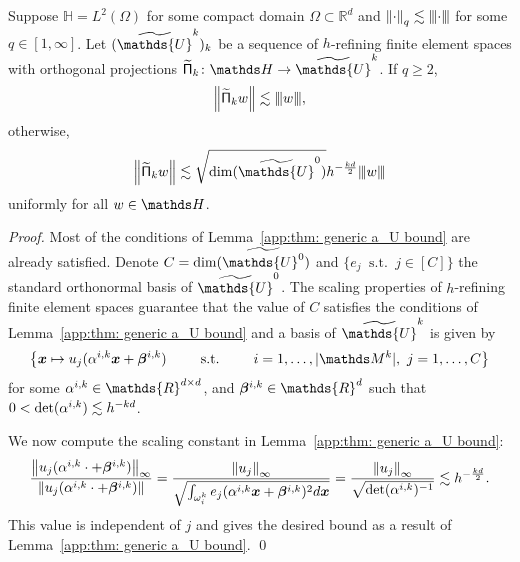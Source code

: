 \documentclass[smallextended]{svjour3}
\let\F\mathds\let\C\mathcal\newcommand{\R}{\F{R}}\newcommand{\A}{\tens{A}}
\newcommand{\norm}[1]{{\left\lVert #1 \right\rVert}}
\newcommand{\Norm}[1]{{\left\vert\kern-0.25ex\left\vert\kern-0.25ex\left\vert #1 \right\vert\kern-0.25ex\right\vert\kern-0.25ex\right\vert}}
\newcommand{\op}[1]{\operatorname{#1}}
\newcommand{\1}{\F{1}}
\DeclareMathOperator{\st}{\;s.t.\;}
\newcommand*{\varf}[1]{%
	\IfEqCase{#1}{%
		{0}{u}%
		{1}{v}%
		{2}{w}%
	}[u#1]%
}
\newcommand*{\spcf}[1]{%
	\IfEqCase{#1}{%
		{0}{\F{U}}%
		{1}{\F{V}}%
		{2}{\F{W}}%
	}[\F{U}#1]%
}
\newcommand*{\varx}[1]{%
	\IfEqCase{#1}{%
		{0}{x}%
		{1}{y}%
		{2}{z}%
		{3}{r}%
	}[x#1]%
}
\newcommand*{\vars}[1]{%
	\IfEqCase{#1}{%
		{0}{\alpha}%
		{1}{\beta}%
		{2}{\gamma}%
		{3}{a}%
		{4}{b}%
		{5}{c}%
	}[k#1]%
}
\newcommand{\Domain}{\Omega}\newcommand{\domain}{\omega}
\newcommand{\meshsize}{h}
\newcommand*{\vvarx}[1]{\vec{\varx{#1}}}
\newcommand*{\vvars}[1]{\vec{\vars{#1}}}
\begin{document}
	
	\begin{lemma}\label{app:thm: specific a_U bound}
		Suppose $\F H= L^2(\Domain)$ for some compact domain $\Domain\subset\R^d$ and $\norm\cdot_q\lesssim \Norm\cdot$ for some $q\in[1,\infty]$. Let $(\tilde{\spcf0}^k)_k$ be a sequence of $\meshsize$-refining finite element spaces with orthogonal projections $\tilde{\tens{\Pi}}_k\colon\F H\to\tilde{\spcf0}^k $. If $q\geq 2$,
		$$\norm{\tilde{\tens{\Pi}}_k\varf2} \lesssim \Norm{\varf2}, $$
		otherwise,
		$$\norm{\tilde{\tens{\Pi}}_k\varf2} \lesssim \sqrt{\op{dim}(\tilde{\spcf0}^0)}\meshsize^{-\frac{kd}{2}}\Norm{\varf2} $$
		uniformly for all $\varf2\in \F H$.
	\end{lemma}
	\begin{proof}
		Most of the conditions of Lemma~\ref{app:thm: generic a_U bound} are already satisfied. Denote $C=\op{dim}(\tilde{\spcf0^0})$ and $\{e_j\st j\in[C]\}$ the standard orthonormal basis of $\tilde{\spcf0}^0$. The scaling properties of $\meshsize$-refining finite element spaces guarantee that the value of $C$ satisfies the conditions of Lemma~\ref{app:thm: generic a_U bound} and a basis of $\tilde{\spcf0}^k$ is given by
		\begin{equation}
			\left\{\vvarx0\mapsto\varf0_j(\vars0^{i,k}\vvarx0+\vvars1^{i,k}) \qquad\st\qquad i=1,\ldots,|\F M^k|,\ j=1,\ldots,C\right\}
		\end{equation}
		for some $\vars0^{i,k}\in\R^{d\times d}$, and $\vvars1^{i,k}\in\R^d$ such that $0<\op{det}(\vars0^{i,k})\lesssim \meshsize^{-kd}$.
		
		We now compute the scaling constant in Lemma~\ref{app:thm: generic a_U bound}:
		\begin{equation}
			\frac{\norm{\varf0_j(\vars0^{i,k}\cdot+\vvars1^{i,k})}_\infty}{\norm{\varf0_j(\vars0^{i,k}\cdot+\vvars1^{i,k})}} = \frac{\norm{\varf0_j}_\infty}{\sqrt{\int_{\domain_i^k} e_j(\vars0^{i,k} \vvarx0+\vvars1^{i,k})^2d\vvarx0}} = \frac{\norm{\varf0_j}_\infty}{\sqrt{\op{det}(\vars0^{i,k})^{-1}}} \lesssim \meshsize^{-\frac{kd}{2}}.
		\end{equation}
		This value is independent of $j$ and gives the desired bound as a result of Lemma~\ref{app:thm: generic a_U bound}.
		\qed\end{proof}
	
\end{document}
